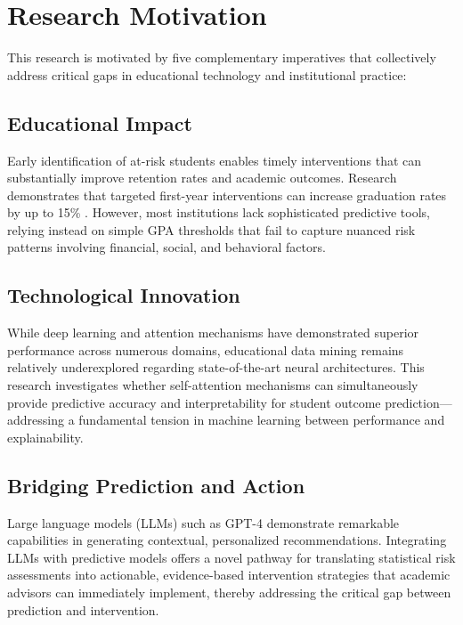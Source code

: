 \section{Research Motivation}

This research is motivated by five complementary imperatives that collectively address critical gaps in educational technology and institutional practice:

\subsection{Educational Impact}

Early identification of at-risk students enables timely interventions that can substantially improve retention rates and academic outcomes. Research demonstrates that targeted first-year interventions can increase graduation rates by up to 15\% \cite{Tinto1993}. However, most institutions lack sophisticated predictive tools, relying instead on simple GPA thresholds that fail to capture nuanced risk patterns involving financial, social, and behavioral factors.

\subsection{Technological Innovation}

While deep learning and attention mechanisms have demonstrated superior performance across numerous domains, educational data mining remains relatively underexplored regarding state-of-the-art neural architectures. This research investigates whether self-attention mechanisms can simultaneously provide predictive accuracy and interpretability for student outcome prediction---addressing a fundamental tension in machine learning between performance and explainability.

\subsection{Bridging Prediction and Action}

Large language models (LLMs) such as GPT-4 demonstrate remarkable capabilities in generating contextual, personalized recommendations. Integrating LLMs with predictive models offers a novel pathway for translating statistical risk assessments into actionable, evidence-based intervention strategies that academic advisors can immediately implement, thereby addressing the critical gap between prediction and intervention.

